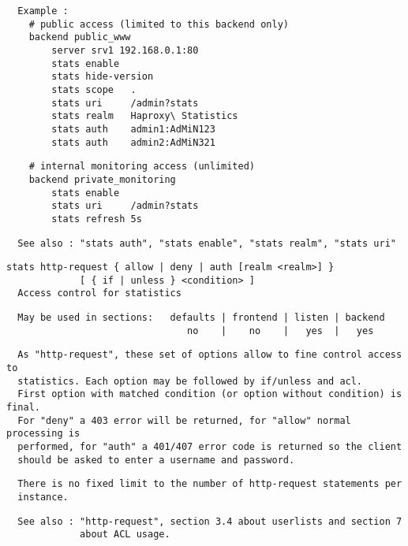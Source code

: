 \begin{verbatim}
  Example :
    # public access (limited to this backend only)
    backend public_www
        server srv1 192.168.0.1:80
        stats enable
        stats hide-version
        stats scope   .
        stats uri     /admin?stats
        stats realm   Haproxy\ Statistics
        stats auth    admin1:AdMiN123
        stats auth    admin2:AdMiN321
\end{verbatim}

\begin{verbatim}
    # internal monitoring access (unlimited)
    backend private_monitoring
        stats enable
        stats uri     /admin?stats
        stats refresh 5s
\end{verbatim}

\begin{verbatim}
  See also : "stats auth", "stats enable", "stats realm", "stats uri"
\end{verbatim}

\begin{verbatim}
stats http-request { allow | deny | auth [realm <realm>] }
             [ { if | unless } <condition> ]
  Access control for statistics
\end{verbatim}

\begin{verbatim}
  May be used in sections:   defaults | frontend | listen | backend
                                no    |    no    |   yes  |   yes
\end{verbatim}

\begin{verbatim}
  As "http-request", these set of options allow to fine control access to
  statistics. Each option may be followed by if/unless and acl.
  First option with matched condition (or option without condition) is final.
  For "deny" a 403 error will be returned, for "allow" normal processing is
  performed, for "auth" a 401/407 error code is returned so the client
  should be asked to enter a username and password.
\end{verbatim}

\begin{verbatim}
  There is no fixed limit to the number of http-request statements per
  instance.
\end{verbatim}

\begin{verbatim}
  See also : "http-request", section 3.4 about userlists and section 7
             about ACL usage.
\end{verbatim}

